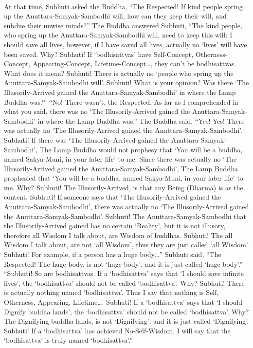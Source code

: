 \documentclass[a5paper,12pt]{book}
\begin{document}
    ~

     At that time, Subhuti asked the Buddha, ``The Respected! If kind people spring up the Anuttara-Samyak-Sambodhi will, how can they keep their will, and subdue their unwise minds?'' The Buddha answered Subhuti, ``The kind people, who spring up the Anuttara-Samyak-Sambodhi will, need to keep this will: I should save all lives, however, if I have saved all lives, actually no `lives' will have been saved. Why? Subhuti! If `bodhisattvas' have Self-Concept, Otherness-Concept, Appearing-Concept, Lifetime-Concept\dots{}, they can't be bodhisattvas. What does it mean? Subhuti! There is actually no `people who spring up the Anuttara-Samyak-Sambodhi will'. Subhuti! What is your opinion? Was there `The Illusorily-Arrived gained the Anuttara-Samyak-Sambodhi' in where the Lamp Buddha was?'' ``No! There wasn't, the Respected. As far as I comprehended in what you said, there was no `The Illusorily-Arrived gained the Anuttara-Samyak-Sambodhi' in where the Lamp Buddha was.'' The Buddha said, ``Yes! Yes! There was actually no `The Illusorily-Arrived gained the Anuttara-Samyak-Sambodhi'. Subhuti! If there was `The Illusorily-Arrived gained the Anuttara-Samyak-Sambodhi', The Lamp Buddha would not prophesy that `You will be a buddha, named Sakya-Muni, in your later life' to me. Since there was actually no `The Illusorily-Arrived gained the Anuttara-Samyak-Sambodhi', The Lamp Buddha prophesied that `You will be a buddha, named Sakya-Muni, in your later life' to me. Why? Subhuti! The Illusorily-Arrived, is that any Being (Dharma) is as the content. Subhuti! If someone says that `The Illusorily-Arrived gained the Anuttara-Samyak-Sambodhi', there was actually no `The Illusorily-Arrived gained the Anuttara-Samyak-Sambodhi'. Subhuti! The Anuttara-Samyak-Sambodhi that the Illusorily-Arrived gained has no certain `Reality', but it is not illusory, therefore all Wisdom I talk about, are Wisdom of buddhas. Subhuti! The all Wisdom I talk about, are not `all Wisdom', thus they are just called `all Wisdom'. Subhuti! For example, if a person has a huge body\dots{}'' Subhuti said, ``The Respected! The huge body, is not `huge body', and it is just called `huge body'.'' ``Subhuti! So are bodhisattvas. If a `bodhisattva' says that `I should save infinite lives', the `bodhisattva' should not be called `bodhisattva'. Why? Subhuti! There is actually nothing named `bodhisattva'. Thus I say that nothing is Self, Otherness, Appearing, Lifetime\dots{}. Subhuti! If a `bodhisattva' says that `I should Dignify buddha lands', the `bodhisattva' should not be called `bodhisattva'. Why? The Dignifying buddha lands, is not `Dignifying', and it is just called `Dignifying'. Subhuti! If a `bodhisattva' has achieved No-Self-Wisdom, I will say that the `bodhisattva' is truly named `bodhisattva'.''
\end{document}
